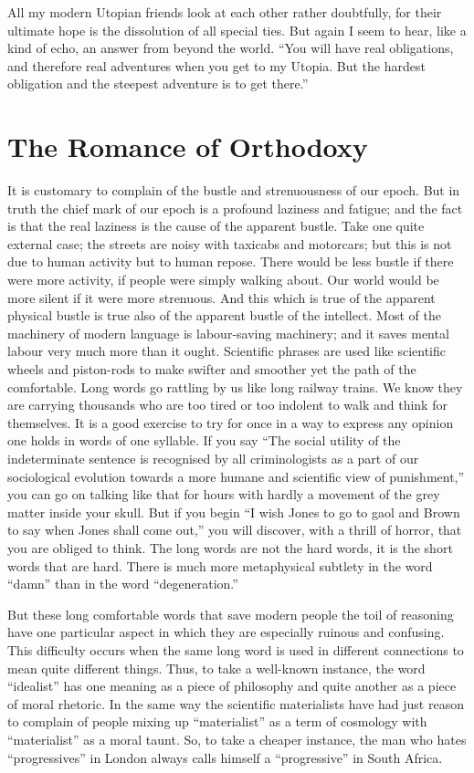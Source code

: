 \documentclass{book}
\begin{document}
All my modern Utopian friends look at each other rather doubtfully, for their ultimate hope is the dissolution of all special ties. But again I seem to hear, like a kind of echo, an answer from beyond the world. “You will have real obligations, and therefore real adventures when you get to my Utopia. But the hardest obligation and the steepest adventure is to get there.”

\chapter{The Romance of Orthodoxy}
\label{chapter-7}
It is customary to complain of the bustle and strenuousness of our epoch. But in truth the chief mark of our epoch is a profound laziness and fatigue; and the fact is that the real laziness is the cause of the apparent bustle. Take one quite external case; the streets are noisy with taxicabs and motorcars; but this is not due to human activity but to human repose. There would be less bustle if there were more activity, if people were simply walking about. Our world would be more silent if it were more strenuous. And this which is true of the apparent physical bustle is true also of the apparent bustle of the intellect. Most of the machinery of modern language is labour-saving machinery; and it saves mental labour very much more than it ought. Scientific phrases are used like scientific wheels and piston-rods to make swifter and smoother yet the path of the comfortable. Long words go rattling by us like long railway trains. We know they are carrying thousands who are too tired or too indolent to walk and think for themselves. It is a good exercise to try for once in a way to express any opinion one holds in words of one syllable. If you say “The social utility of the indeterminate sentence is recognised by all criminologists as a part of our sociological evolution towards a more humane and scientific view of punishment,” you can go on talking like that for hours with hardly a movement of the grey matter inside your skull. But if you begin “I wish Jones to go to gaol and Brown to say when Jones shall come out,” you will discover, with a thrill of horror, that you are obliged to think. The long words are not the hard words, it is the short words that are hard. There is much more metaphysical subtlety in the word “damn” than in the word “degeneration.”

But these long comfortable words that save modern people the toil of reasoning have one particular aspect in which they are especially ruinous and confusing. This difficulty occurs when the same long word is used in different connections to mean quite different things. Thus, to take a well-known instance, the word “idealist” has one meaning as a piece of philosophy and quite another as a piece of moral rhetoric. In the same way the scientific materialists have had just reason to complain of people mixing up “materialist” as a term of cosmology with “materialist” as a moral taunt. So, to take a cheaper instance, the man who hates “progressives” in London always calls himself a “progressive” in South Africa.
\end{document}
